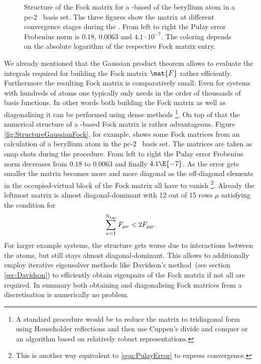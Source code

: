 \begin{landscape}
\begin{figure}
	\centering
	\caption[Structure of the Fock matrix for a \cGTO-based \SCF]
		{Structure of the Fock matrix for a \cGTO-based \SCF
		of the beryllium atom
		in a pc-2~\cite{Jensen2007} basis set.
		The three figures show the matrix
		at different convergence stages during the \SCF.
		From left to right the Pulay error
		Frobenius norm is $0.18$, $0.0063$ and $4.1 \cdot 10^{-7}$.
		The coloring depends on the absolute logarithm
		of the respective Fock matrix entry.
	}
	\label{fig:StructureGaussianFock}
\end{figure}
\end{landscape}
We already mentioned that the Gaussian product theorem
allows to evaluate the integrals
required for building the Fock matrix $\mat{F}$
rather efficiently.
Furthermore the resulting Fock matrix is comparatively small:
Even for systems with hundreds of atoms one typically only needs
in the order of thousands of basis functions.
In other words both building the Fock matrix
as well as diagonalising it can be performed using dense methods%
\noindent
\footnote{%
	A standard procedure would be to reduce the matrix to
	tridiagonal form using Householder reflections
	and then use Cuppen's divide and conquer
	or an algorithm based on relatively robust representations.
}.
On top of that the numerical structure of a \cGTO-based Fock matrix
is rather advantageous.
Figure \vref{fig:StructureGaussianFock}, for example,
shows some Fock matrices from an \SCF calculation
of a beryllium atom
in the pc-2~\cite{Jensen2007} basis set.
The matrices are taken as snap shots during the \SCF procedure.
From left to right the Pulay error Frobenius norm decreases
from $0.18$ to $0.0063$ and finally $4.1\E{-7}$.
As the error gets smaller the matrix becomes more and more diagonal
as the off-diagonal elements in the occupied-virtual block of the
Fock matrix all have to vanish%
\footnote{This is another way equivalent to \eqref{eqn:PulayError}
to express \SCF convergence.}.
Already the leftmost matrix is almost diagonal-dominant with 12
out of 15 rows $\mu$
satisfying the condition for 
\[
	\sum_{\nu=1}^{N_\text{bas}} F_{\mu\nu} < 2 F_{\mu\mu}.
\]
For larger example systems,
the structure gets worse due to interactions between
the atoms, but still stays almost diagonal-dominant.
This allows to additionally employ
iterative eigensolver methods like Davidson's method~(see section \vref{sec:Davidson})
to efficiently obtain eigenpairs of the Fock matrix if not all are required.
In summary both obtaining and diagonalising Fock matrices
from a \cGTO discretisation is numerically no problem.

